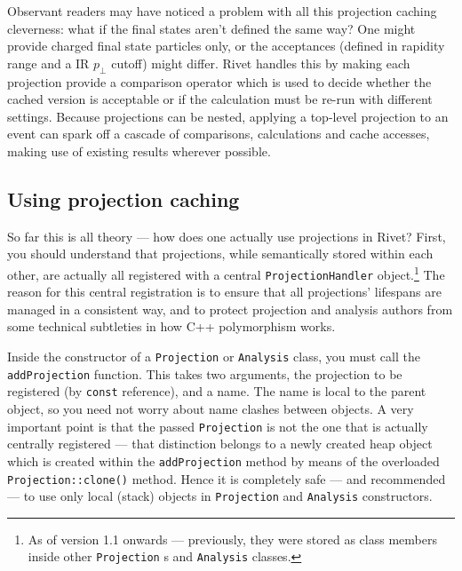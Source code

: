\documentclass{JHEP3}
\newcommand{\code}[1]{\texttt{#1}\xspace}
\begin{document}
Observant readers may have noticed a problem with all this projection caching
cleverness: what if the final states aren't defined the same way? One might
provide charged final state particles only, or the acceptances (defined in
rapidity range and a IR $p_\perp$ cutoff) might differ. Rivet handles this by
making each projection provide a comparison operator which is used to decide
whether the cached version is acceptable or if the calculation must be re-run
with different settings. Because projections can be nested, applying a top-level
projection to an event can spark off a cascade of comparisons, calculations and
cache accesses, making use of existing results wherever possible.

\subsection{Using projection caching}
So far this is all theory --- how does one actually use projections in Rivet?
First, you should understand that projections, while semantically stored within
each other, are actually all registered with a central \code{ProjectionHandler}
object.\footnote{As of version 1.1 onwards --- previously, they were stored as
  class members inside other \code{Projection}s and \code{Analysis} classes.}
The reason for this central registration is to ensure that all projections'
lifespans are managed in a consistent way, and to protect projection and
analysis authors from some technical subtleties in how C++ polymorphism works.

Inside the constructor of a \code{Projection} or \code{Analysis} class, you must
call the \code{addProjection} function. This takes two arguments, the projection
to be registered (by \code{const} reference), and a name. The name is local to
the parent object, so you need not worry about name clashes between objects. A
very important point is that the passed \code{Projection} is not the one that is
actually centrally registered --- that distinction belongs to a newly created
heap object which is created within the \code{addProjection} method by means of
the overloaded \code{Projection::clone()} method. Hence it is completely safe
--- and recommended --- to use only local (stack) objects in \code{Projection}
and \code{Analysis} constructors.
\end{document}
